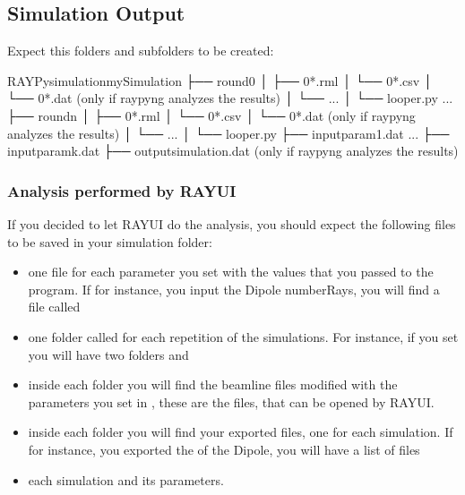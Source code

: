 \documentclass[letterpaper,10pt,english]{sphinxmanual}
\begin{document}
\subsection{Simulation Output}
\label{\detokenize{tutorial:simulation-output}}
\sphinxAtStartPar
Expect this folders and subfolders to be created:

\begin{sphinxVerbatim}[commandchars=\\\{\}]
RAYPy\PYGZus{}simulation\PYGZus{}mySimulation
├── round\PYGZus{}0
│   ├── 0\PYGZus{}*.rml
│   └── 0\PYGZus{}*.csv
│   └── 0\PYGZus{}*.dat (only if raypyng analyzes the results)
│   └── ...
│   └── looper.py
...
├── round\PYGZus{}n
│   ├── 0\PYGZus{}*.rml
│   └── 0\PYGZus{}*.csv
│   └── 0\PYGZus{}*.dat (only if raypyng analyzes the results)
│   └── ...
│   └── looper.py
├── input\PYGZus{}param\PYGZus{}1.dat
...
├── input\PYGZus{}param\PYGZus{}k.dat
├── output\PYGZus{}simulation.dat (only if raypyng analyzes the results)
\end{sphinxVerbatim}


\subsubsection{Analysis performed by RAY\sphinxhyphen{}UI}
\label{\detokenize{tutorial:analysis-performed-by-ray-ui}}
\sphinxAtStartPar
If you decided to let RAY\sphinxhyphen{}UI do the analysis, you should expect the following files to be
saved in your simulation folder:
\begin{itemize}
\item {} 
\sphinxAtStartPar
one file for each parameter you set with the values that you passed to the program.
If for instance, you input the Dipole numberRays, you will find a file called

\item {} 
\sphinxAtStartPar
one folder called  for each repetition of the simulations.
For instance, if you set  you will have two folders  and 

\item {} 
\sphinxAtStartPar
inside each  folder you will find the beamline files modified
with the parameters you set in , these are the  files,
that can be opened by RAY\sphinxhyphen{}UI.

\item {} 
\sphinxAtStartPar
inside each  folder you will find your exported files, one for
each simulation. If for instance, you exported the  of the Dipole,
you will have a list of files 

\item {} 
\sphinxAtStartPar
{} each simulation and its parameters.

\end{itemize}
\end{document}
